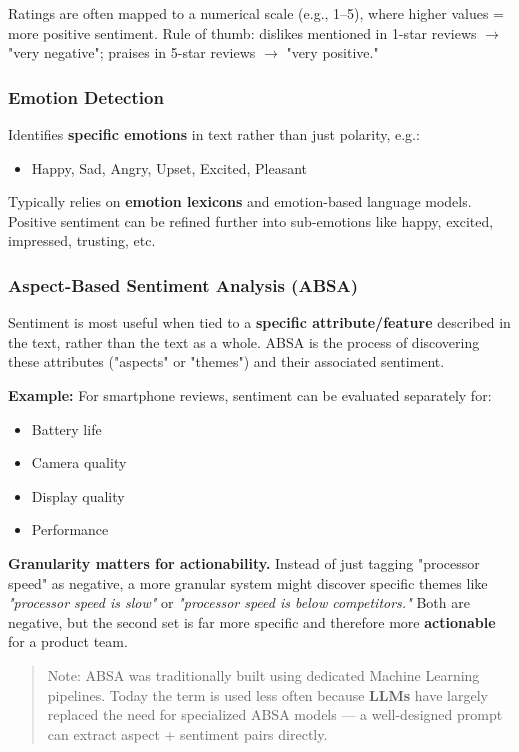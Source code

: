 \documentclass[12pt,openany]{book}
\begin{document}
Ratings are often mapped to a numerical scale (e.g., 1--5), where higher values = more positive sentiment. Rule of thumb: dislikes mentioned in 1-star reviews \(\rightarrow\) "very negative"; praises in 5-star reviews \(\rightarrow\) "very positive."

\subsubsection{Emotion Detection}

Identifies \textbf{specific emotions} in text rather than just polarity, e.g.:
\begin{itemize}[leftmargin=*]
    \item Happy, Sad, Angry, Upset, Excited, Pleasant
\end{itemize}

Typically relies on \textbf{emotion lexicons} and emotion-based language models. Positive sentiment can be refined further into sub-emotions like happy, excited, impressed, trusting, etc.

\subsubsection{Aspect-Based Sentiment Analysis (ABSA)}

Sentiment is most useful when tied to a \textbf{specific attribute/feature} described in the text, rather than the text as a whole. ABSA is the process of discovering these attributes ("aspects" or "themes") and their associated sentiment.

\textbf{Example:} For smartphone reviews, sentiment can be evaluated separately for:
\begin{itemize}[leftmargin=*]
    \item Battery life
    \item Camera quality
    \item Display quality
    \item Performance
\end{itemize}

\textbf{Granularity matters for actionability.} Instead of just tagging "processor speed" as negative, a more granular system might discover specific themes like \textit{"processor speed is slow"} or \textit{"processor speed is below competitors."} Both are negative, but the second set is far more specific and therefore more \textbf{actionable} for a product team.

\begin{quote}
Note: ABSA was traditionally built using dedicated Machine Learning pipelines. Today the term is used less often because \textbf{LLMs} have largely replaced the need for specialized ABSA models --- a well-designed prompt can extract aspect + sentiment pairs directly.\par

\end{quote}
\end{document}
